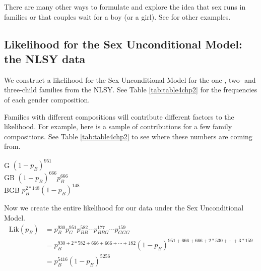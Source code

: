\documentclass[
]{krantz}
\newcommand{\Lik}{\mathrm{Lik}}
\renewenvironment{quote}{\begin{VF}}{\end{VF}}
\begin{document}
\begin{table}[t]

\caption{\label{tab:table7chp2}Proportion of families with only one boy who is born last.}
\centering
{}
\end{table}

There are many other ways to formulate and explore the idea that sex runs in families or that couples wait for a boy (or a girl). See \citet{Rodgers2001} for other examples.

\hypertarget{likelihood-for-the-sex-unconditional-model-the-nlsy-data}{%
\subsection{Likelihood for the Sex Unconditional Model: the NLSY data}\label{likelihood-for-the-sex-unconditional-model-the-nlsy-data}}

We construct a likelihood for the Sex Unconditional Model for the one-, two- and three-child families from the NLSY. See Table \ref{tab:table4chp2} for the frequencies of each gender composition.

Families with different compositions will contribute different factors to the likelihood. For example, here is a sample of contributions for a few family compositions. See Table \ref{tab:table4chp2} to see where these numbers are coming from.

\begin{quote}
G \((1-p_B)^{951}\)\\
GB \((1-p_B)^{666}p_B^{666}\)\\
BGB \(p_B^{2*148}(1-p_B)^{148}\)
\end{quote}

Now we create the entire likelihood for our data under the Sex Unconditional Model.
\begin{align*}
 \Lik(p_B) &= p_B^{930}p_G^{951}p_{BB}^{582} \cdots p_{BBG}^{177} \cdots p_{GGG}^{159} \\
 &= p_B^{930+2*582+666+666+\cdots+182}(1-p_B)^{951+666+666+2*530+\cdots+3*159} \\
 &=  p_B^{5416}(1-p_B)^{5256} \\
 \label{eq:likSexUn}
\end{align*}
\end{document}
